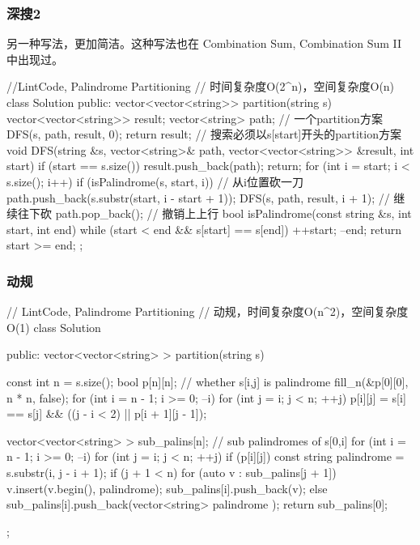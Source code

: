 \subsubsection{深搜2}
另一种写法，更加简洁。这种写法也在 Combination Sum, Combination Sum II 中出现过。
\begin{Code}
//LintCode, Palindrome Partitioning
// 时间复杂度O(2^n)，空间复杂度O(n)
class Solution {
public:
    vector<vector<string>> partition(string s) {
        vector<vector<string>> result;
        vector<string> path;  // 一个partition方案
        DFS(s, path, result, 0);
        return result;
    }
    // 搜索必须以s[start]开头的partition方案
    void DFS(string &s, vector<string>& path,
            vector<vector<string>> &result, int start) {
        if (start == s.size()) {
            result.push_back(path);
            return;
        }
        for (int i = start; i < s.size(); i++) {
            if (isPalindrome(s, start, i)) { // 从i位置砍一刀
                path.push_back(s.substr(start, i - start + 1));
                DFS(s, path, result, i + 1);  // 继续往下砍
                path.pop_back(); // 撤销上上行
            }
        }
    }
    bool isPalindrome(const string &s, int start, int end) {
        while (start < end && s[start] == s[end]) {
            ++start;
            --end;
        }
        return start >= end;
    }
};
\end{Code}


\subsubsection{动规}
\begin{Code}
// LintCode, Palindrome Partitioning
// 动规，时间复杂度O(n^2)，空间复杂度O(1)
class Solution {
public:
    vector<vector<string> > partition(string s) {
        const int n = s.size();
        bool p[n][n]; // whether s[i,j] is palindrome
        fill_n(&p[0][0], n * n, false);
        for (int i = n - 1; i >= 0; --i)
            for (int j = i; j < n; ++j)
                p[i][j] = s[i] == s[j] && ((j - i < 2) || p[i + 1][j - 1]);

        vector<vector<string> > sub_palins[n]; // sub palindromes of s[0,i]
        for (int i = n - 1; i >= 0; --i) {
            for (int j = i; j < n; ++j)
                if (p[i][j]) {
                    const string palindrome = s.substr(i, j - i + 1);
                    if (j + 1 < n) {
                        for (auto v : sub_palins[j + 1]) {
                            v.insert(v.begin(), palindrome);
                            sub_palins[i].push_back(v);
                        }
                    } else {
                        sub_palins[i].push_back(vector<string> { palindrome });
                    }
                }
        }
        return sub_palins[0];
    }
};
\end{Code}


